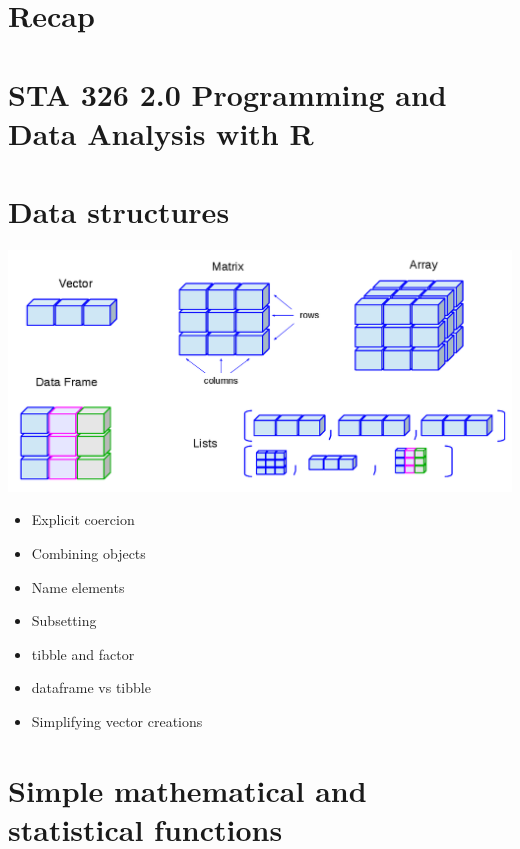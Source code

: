 \documentclass[]{article}
\author{}
\date{\vspace{-2.5em}}
\begin{document}
\hypertarget{recap}{%
\section{Recap}\label{recap}}

\hypertarget{sta-326-2.0-programming-and-data-analysis-with-r}{%
\section{STA 326 2.0 Programming and Data Analysis with
R}\label{sta-326-2.0-programming-and-data-analysis-with-r}}

\hypertarget{data-structures}{%
\section{Data structures}\label{data-structures}}

\includegraphics{dataStructures.png}

\begin{itemize}
\item
  Explicit coercion
\item
  Combining objects
\item
  Name elements
\item
  Subsetting
\item
  tibble and factor
\item
  dataframe vs tibble
\item
  Simplifying vector creations
\end{itemize}

\hypertarget{simple-mathematical-and-statistical-functions}{%
\section{Simple mathematical and statistical
functions}\label{simple-mathematical-and-statistical-functions}}
\end{document}
